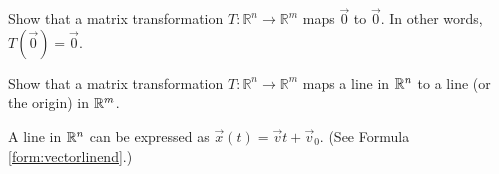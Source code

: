\documentclass{ximera}
\begin{document}
\begin{problem}\label{prb:6.4} Show that a matrix transformation  $T:\mathbb{R}^{n}\rightarrow \mathbb{R}^{m}$
maps $\vec{0}$ to $\vec{0}$.  In other words, $T\left(\vec{0}\right) = \vec{0}$.

\end{problem}

\begin{problem}\label{prb:linesToLines} Show that a matrix transformation $T:\mathbb{R}^{n}\rightarrow \mathbb{R}^{m}$
maps a line in $\mathbb{R}^n$ to a line (or the origin) in $\mathbb{R}^m$.
\begin{hint}
A line in $\mathbb{R}^n$ can be expressed as $\vec{x}(t)=\vec{v}t+\vec{v}_0$. (See Formula \ref{form:vectorlinend}.)
\end{hint}
\end{problem}
\end{document}
